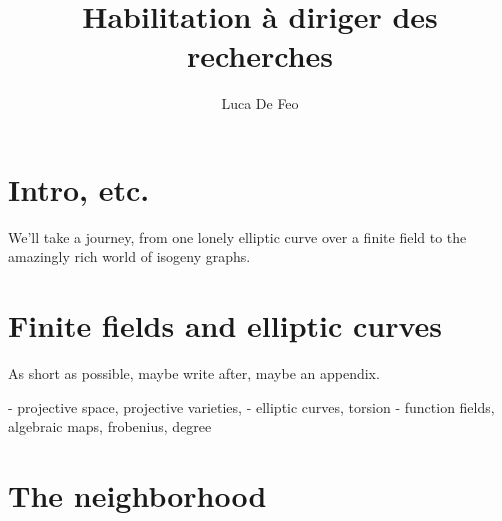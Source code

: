 \documentclass{report}
\title{Habilitation à diriger des recherches}
\author{Luca De Feo}
\theoremstyle{plain}
\theoremstyle{definition}
\begin{document}
\maketitle
\thispagestyle{fancy}
\renewcommand{\headrulewidth}{0pt}
\renewcommand{\footrulewidth}{0.4pt}
\cfoot{\doclicenseThis}


\chapter{Intro, etc.}

We'll take a journey, from one lonely elliptic curve over a finite
field to the amazingly rich world of isogeny graphs.


\chapter{Finite fields and elliptic curves}

As short as possible, maybe write after, maybe an appendix.

- projective space, projective varieties,
- elliptic curves, torsion
- function fields, algebraic maps, frobenius, degree



\chapter{The neighborhood}

%

\end{document}
